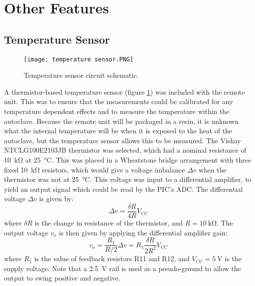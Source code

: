 \section{Other Features}

\subsection{Temperature Sensor}
\begin{figure}[htb]
	\centering
	\texttt{[image: temperature sensor.PNG]}
	\caption{Temperature sensor circuit schematic.}
	\label{fig: temperature sensor}
\end{figure}

A thermistor-based temperature sensor (figure \ref{fig: temperature sensor}) was included with the remote unit. This was to ensure that the measurements could be calibrated for any temperature dependent effects and to measure the temperature within the autoclave. Because the remote unit will be packaged in a resin, it is unknown what the internal temperature will be when it is exposed to the heat of the autoclave, but the temperature sensor allows this to be measured. The Vishay NTCLG100E2103JB \cite{thermistor} thermistor was selected, which had a nominal resistance of \SI{10}{\kilo\ohm} at \SI{25}{\celsius}. This was placed in a Wheatstone bridge arrangement with three fixed \SI{10}{\kilo\ohm} resistors, which would give a voltage imbalance $\Delta v$ when the thermistor was not at \SI{25}{\celsius}. This voltage was input to a differential amplifier, to yield an output signal which could be read by the PIC's ADC. The differential voltage $\Delta v$ is given by:
\begin{equation}
\Delta v = \frac{\delta R}{4 R}V_{CC}
\end{equation}
where $\delta R$ is the change in resistance of the thermistor, and $R=\SI{10}{\kilo\ohm}$. The output voltage $v_o$ is then given by applying the differential amplifier gain:
\begin{equation}
v_o = \frac{R_1}{R / 2} \Delta v =R_1 \frac{\delta R}{2 R^2}V_{CC}
\end{equation}
where $R_1$ is the value of feedback resistors R11 and R12, and $V_{CC} =\SI{5}{\volt}$ is the supply voltage. Note that a \SI{2.5}{\volt} rail is used as a pseudo-ground to allow the output to swing positive and negative.\\

